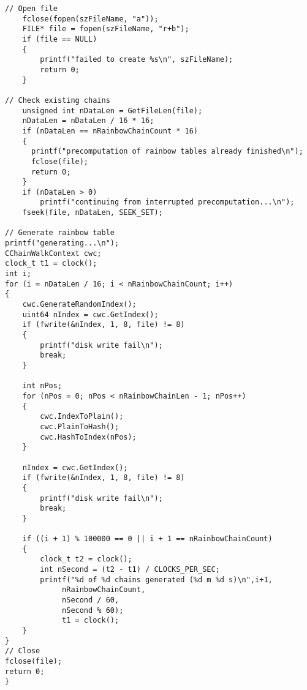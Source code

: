 \begin{lstlisting}
// Open file
	fclose(fopen(szFileName, "a"));
	FILE* file = fopen(szFileName, "r+b");
	if (file == NULL)
	{
		printf("failed to create %s\n", szFileName);
		return 0;
	}

// Check existing chains
	unsigned int nDataLen = GetFileLen(file);
	nDataLen = nDataLen / 16 * 16;
	if (nDataLen == nRainbowChainCount * 16)
	{
	  printf("precomputation of rainbow tables already finished\n");
	  fclose(file);
	  return 0;
	}
	if (nDataLen > 0)
		printf("continuing from interrupted precomputation...\n");
	fseek(file, nDataLen, SEEK_SET);

// Generate rainbow table
printf("generating...\n");
CChainWalkContext cwc;
clock_t t1 = clock();
int i;
for (i = nDataLen / 16; i < nRainbowChainCount; i++)
{
	cwc.GenerateRandomIndex();
	uint64 nIndex = cwc.GetIndex();
	if (fwrite(&nIndex, 1, 8, file) != 8)
	{
		printf("disk write fail\n");
		break;
	}

	int nPos;
	for (nPos = 0; nPos < nRainbowChainLen - 1; nPos++)
	{
		cwc.IndexToPlain();
		cwc.PlainToHash();
		cwc.HashToIndex(nPos);
	}

	nIndex = cwc.GetIndex();
	if (fwrite(&nIndex, 1, 8, file) != 8)
	{
		printf("disk write fail\n");
		break;
	}

	if ((i + 1) % 100000 == 0 || i + 1 == nRainbowChainCount)
	{
		clock_t t2 = clock();
		int nSecond = (t2 - t1) / CLOCKS_PER_SEC;
		printf("%d of %d chains generated (%d m %d s)\n",i+1,
			 nRainbowChainCount,
			 nSecond / 60,
			 nSecond % 60);
			 t1 = clock();
	}
}
// Close
fclose(file);
return 0;
}
\end{lstlisting}
